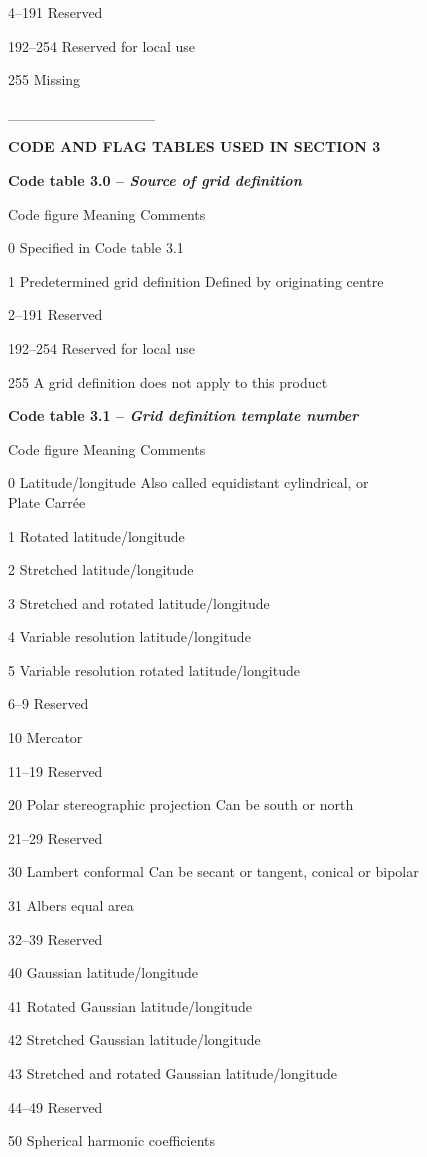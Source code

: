 4--191 Reserved

192--254 Reserved for local use

255 Missing

\_\_\_\_\_\_\_\_\_\_\_\_\_\_

\textbf{CODE AND FLAG TABLES USED IN SECTION 3}

\textbf{Code table 3.0 -- \emph{Source of grid definition}}

Code figure Meaning Comments

0 Specified in Code table 3.1

1 Predetermined grid definition Defined by originating centre

2--191 Reserved

192--254 Reserved for local use

255 A grid definition does not apply to this product

\textbf{Code table 3.1 -- \emph{Grid definition template number}}

Code figure Meaning Comments

0 Latitude/longitude Also called equidistant cylindrical, or\\
Plate Carrée

1 Rotated latitude/longitude

2 Stretched latitude/longitude

3 Stretched and rotated latitude/longitude

4 Variable resolution latitude/longitude

5 Variable resolution rotated latitude/longitude

6--9 Reserved

10 Mercator

11--19 Reserved

20 Polar stereographic projection Can be south or north

21--29 Reserved

30 Lambert conformal Can be secant or tangent, conical or bipolar

31 Albers equal area

32--39 Reserved

40 Gaussian latitude/longitude

41 Rotated Gaussian latitude/longitude

42 Stretched Gaussian latitude/longitude

43 Stretched and rotated Gaussian latitude/longitude

44--49 Reserved

50 Spherical harmonic coefficients

